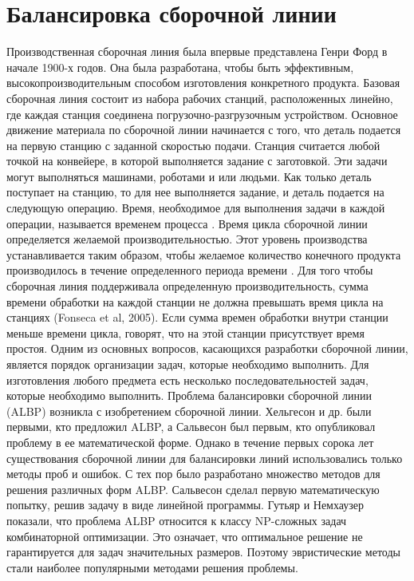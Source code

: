 \section{Балансировка сборочной линии}

Производственная сборочная линия была впервые представлена
Генри Форд в начале 1900-х годов. Она была разработана, чтобы быть эффективным,
высокопроизводительным способом изготовления конкретного продукта. Базовая сборочная
линия состоит из набора рабочих станций, расположенных линейно, где каждая станция соединена погрузочно-разгрузочным устройством.
Основное движение материала по сборочной линии начинается с того, что деталь подается на первую станцию с
заданной скоростью подачи. Станция считается любой точкой на конвейере, в которой 
выполняется задание с заготовкой. Эти задачи могут выполняться машинами, роботами и
или людьми. Как только деталь поступает на станцию, то для нее выполняется задание, 
и деталь подается на следующую операцию. Время, необходимое для выполнения задачи
в каждой операции, называется временем процесса \cite{Sury}. Время цикла сборочной 
линии определяется желаемой производительностью. Этот уровень производства 
устанавливается таким образом, чтобы желаемое количество конечного продукта 
производилось в течение определенного периода времени \cite{Baybars}. Для того чтобы 
сборочная линия поддерживала определенную производительность, сумма времени обработки
на каждой станции не должна превышать время цикла на станциях (Fonseca et al, 2005). 
Если сумма времен обработки внутри станции меньше времени цикла, говорят, что на этой
станции присутствует время простоя. Одним из основных вопросов,
касающихся разработки сборочной линии, является порядок организации задач, которые 
необходимо выполнить. Для изготовления любого предмета есть несколько 
последовательностей задач, которые необходимо выполнить. Проблема балансировки 
сборочной линии (ALBP) возникла с изобретением сборочной линии. Хельгесон и др. 
\cite{Helgeson} были первыми, кто предложил ALBP, а Сальвесон \cite{Salveson}
был первым, кто опубликовал проблему в ее математической форме. 
Однако в течение первых сорока лет существования сборочной линии для балансировки
линий использовались только методы проб и ошибок. С тех пор 
было разработано множество методов для решения различных форм ALBP. 
Сальвесон \cite{Salveson} сделал первую математическую попытку, решив задачу в
виде линейной программы. Гутьяр и Немхаузер \cite{Gutjahr} показали,
что проблема ALBP относится к классу NP-сложных задач комбинаторной оптимизации.
Это означает, что оптимальное решение не гарантируется для задач значительных размеров. 
Поэтому эвристические методы стали наиболее популярными методами решения проблемы.



